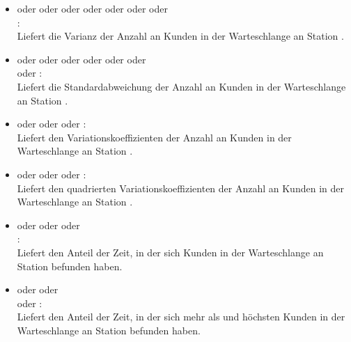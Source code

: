 \begin{itemize}
\item
{} oder  oder  oder  oder  oder  oder  oder\\
:\\
Liefert die Varianz der Anzahl an Kunden in der Warteschlange an Station .

\item
{} oder  oder  oder  oder  oder  oder\\  oder :\\
Liefert die Standardabweichung der Anzahl an Kunden in der Warteschlange an Station .

\item
{} oder  oder  oder :\\
Liefert den Variationskoeffizienten der Anzahl an Kunden in der Warteschlange an Station .

\item
{} oder  oder  oder :\\
Liefert den quadrierten Variationskoeffizienten der Anzahl an Kunden in der Warteschlange an Station .

\item
{} oder  oder  oder\\ :\\
Liefert den Anteil der Zeit, in der sich  Kunden in der Warteschlange an Station  befunden haben.

\item
{} oder  oder\\  oder :\\
Liefert den Anteil der Zeit, in der sich mehr als  und höchsten  Kunden in der Warteschlange an Station  befunden haben.

\end{itemize}



